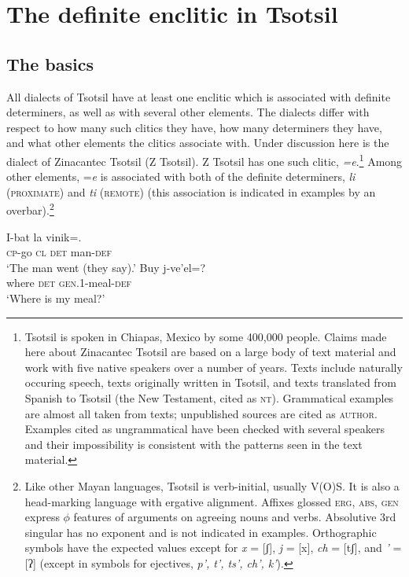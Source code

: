 \documentclass[output=paper,
modfonts
]{LSP/langsci}
\begin{document}
\section{The definite enclitic in Tsotsil}
\subsection{The basics}
All dialects of Tsotsil have at least one enclitic which is associated with definite determiners, as well as with several other elements. 
The dialects differ with respect to how many such clitics they have, how many determiners they have, and what other elements the clitics associate with. Under discussion here is the dialect of Zinacantec Tsotsil (Z Tsotsil). Z Tsotsil has one such clitic, \emph{=e}.\footnote{Tsotsil is spoken in Chiapas, Mexico by some 400,000 people. 
Claims made here about Zinacantec Tsotsil are based on a large body of text material and work with five native speakers over a number of years. 
Texts include naturally occuring speech, texts originally written in Tsotsil, and texts translated from Spanish to Tsotsil (the New Testament, cited as \textsc{nt}).
Grammatical examples are almost all taken from texts; unpublished sources are cited as \textsc{author}. 
Examples cited as ungrammatical have been checked with several speakers and their impossibility is consistent with the patterns seen in the text material.}
Among other elements, =\emph{e} is associated with both of the definite determiners, \emph{li} (\textsc{proximate}) and \emph{ti} (\textsc{remote}) (this association is indicated in examples by an overbar).\footnote
{Like other Mayan languages, Tsotsil is verb-initial, usually V(O)S. It is also a head-marking language with ergative alignment.  Affixes glossed \textsc{erg, abs, gen}
express $\phi$ features of arguments on agreeing nouns and verbs. Absolutive 3rd singular has no exponent and is not indicated in examples. 
Orthographic symbols have the expected values except for \emph{x} = [ʃ], \emph{j} = [x], \emph{ch} = [tʃ], and \emph{'} = [ʔ] (except in symbols for ejectives, \emph{p', t', ts', ch', k'}).
}
 \label{footnote:agreement}
 \begin{exe}
\ex\label{exe:exe4}
\begin{xlist}
\bridgeoverex
{}
\gll I-bat la  vinik=.\\
\textsc{cp}-go \textsc{cl} \textsc{det} man-\textsc{def} \\
\glt `The man went (they say).' \citep[28]{laughlin1977}
\bridgeoverex
{}
\gll Buy  j-ve'el=? \\
where \textsc{det} \textsc{gen.1}-meal-\textsc{def} \\
\glt `Where is my meal?' \citep[57]{laughlin1977}
\end{xlist}
\end{exe}
\end{document}
